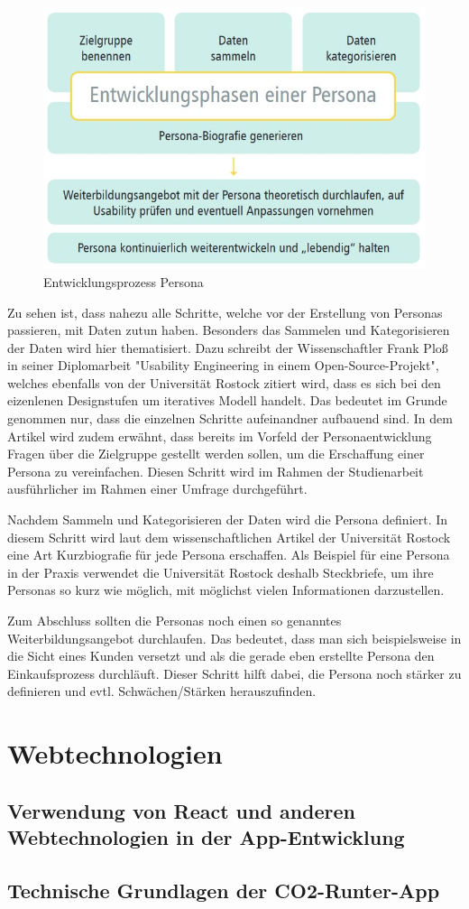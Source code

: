 \begin{figure}[h]
    \centering
    \includegraphics[width=1\textwidth]{images/03/entwicklungPersona.jpg}
    \caption{Entwicklungsprozess Persona \cite{personamethode}}
\end{figure}

Zu sehen ist, dass nahezu alle Schritte, welche vor der Erstellung von Personas passieren, mit Daten zutun haben. Besonders das Sammelen und Kategorisieren der Daten wird hier thematisiert.\cite{personamethode} Dazu schreibt der Wissenschaftler Frank Ploß in seiner Diplomarbeit "Usability Engineering in einem Open-Source-Projekt", welches ebenfalls von der Universität Rostock zitiert wird, dass es sich bei den eizenlenen Designstufen um iteratives Modell handelt.\cite{osp:masterthesis}
Das bedeutet im Grunde genommen nur, dass die einzelnen Schritte aufeinandner aufbauend sind. In dem Artikel wird zudem erwähnt, dass bereits im Vorfeld der Personaentwicklung Fragen über die Zielgruppe gestellt werden sollen, um die Erschaffung einer Persona zu vereinfachen.\cite{personamethode}
Diesen Schritt wird im Rahmen der Studienarbeit ausführlicher im Rahmen einer Umfrage durchgeführt.

Nachdem Sammeln und Kategorisieren der Daten wird die Persona definiert.\cite{personamethode} In diesem Schritt wird laut dem wissenschaftlichen Artikel der Universität Rostock eine Art Kurzbiografie für jede Persona erschaffen.\cite{personamethode} Als Beispiel für eine Persona in der Praxis verwendet die Universität Rostock deshalb Steckbriefe, um ihre Personas so kurz wie möglich, mit möglichst vielen Informationen darzustellen.\cite{personamethode}

Zum Abschluss sollten die Personas noch einen so genanntes Weiterbildungsangebot durchlaufen. Das bedeutet, dass man sich beispielsweise in die Sicht eines Kunden versetzt und als die gerade eben erstellte Persona den Einkaufsprozess durchläuft.\cite{personamethode} Dieser Schritt hilft dabei, die Persona noch stärker zu definieren und evtl. Schwächen/Stärken herauszufinden.
\section{Webtechnologien}

\subsection{Verwendung von React und anderen Webtechnologien in der App-Entwicklung}

\subsection{Technische Grundlagen der CO2-Runter-App}
